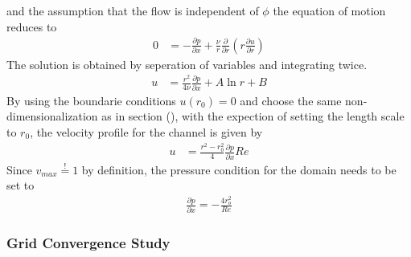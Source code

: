 and the assumption that the flow is independent of $\phi$ the equation of motion reduces to
\begin{align}
        0 &= - \frac{\partial p}{\partial x}  +  \frac{\nu}{r}\frac{\partial}{\partial r}\left(r\frac{\partial u}{\partial r}\right)
\end{align}
The solution is obtained by seperation of variables and integrating twice.
\begin{align}
    u &= \frac{r^2}{4\nu}\frac{\partial p}{\partial x} + A \ln r + B
\end{align}
By using the boundarie conditions $u(r_0) = 0$ and choose the same non-dimensionalization as in section (), with the expection of setting the length scale to $r_0$,
the velocity profile for the channel is given by
\begin{align}
    u &= \frac{r^2 - r_0^2}{4}\frac{\partial p}{\partial x}Re
\end{align}
Since $v_{max} \stackrel{!}{=} 1$ by definition, the pressure condition for the domain needs to be set to
\begin{align}
    \frac{\partial p}{\partial x} = -\frac{4 r_o^2}{Re}
\end{align}

\subsubsection{Grid Convergence Study}

